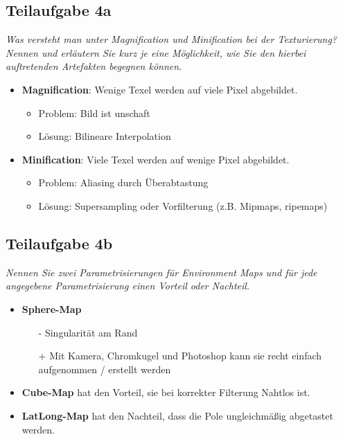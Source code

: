 \documentclass[a4paper]{scrartcl}
\begin{document}
\subsection*{Teilaufgabe 4a}
\textit{Was versteht man unter Magnification und Minification bei der Texturierung? Nennen
und erläutern Sie kurz je eine Möglichkeit, wie Sie den hierbei auftretenden Artefakten
begegnen können.}

\begin{itemize}
    \item \textbf{Magnification}: Wenige Texel werden auf viele Pixel abgebildet.
    \begin{itemize}
        \item Problem: Bild ist unschaft
        \item Lösung: Bilineare Interpolation
    \end{itemize}
    \item \textbf{Minification}: Viele Texel werden auf wenige Pixel abgebildet.
    \begin{itemize}
        \item Problem: Aliasing durch Überabtastung
        \item Lösung: Supersampling oder Vorfilterung (z.B. Mipmaps, ripemaps)
    \end{itemize}
\end{itemize}

\subsection*{Teilaufgabe 4b}
\textit{Nennen Sie zwei Parametrisierungen für Environment Maps und für jede angegebene
Parametrisierung einen Vorteil oder Nachteil.}\\
\begin{itemize}
    \item \textbf{Sphere-Map}
    \begin{itemize}
        \item[-] Singularität am Rand
        \item[+] Mit Kamera, Chromkugel und Photoshop kann sie recht einfach
                 aufgenommen / erstellt werden
    \end{itemize}
    \item \textbf{Cube-Map} hat den Vorteil, sie bei korrekter Filterung
          Nahtlos ist.
    \item \textbf{LatLong-Map} hat den Nachteil, dass die Pole ungleichmäßig
          abgetastet werden.
\end{itemize}
\end{document}
